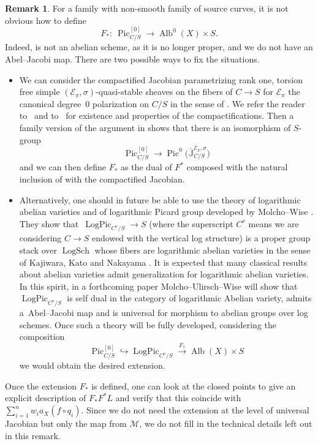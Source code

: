 \documentclass[pdftex]{sigma}
\newcommand{\Pic}{\operatorname{Pic}}
\newcommand{\Alb}{\operatorname{Alb}}
\newcommand{\M}{\mathcal{M}}
\numberwithin{equation}{section}
\theoremstyle{definition}
\newtheorem{remarkk}[theo]{Remark}
\begin{document}
\begin{remarkk}
For a family  with non-smooth family of source curves, it is not obvious how to define
\[F_*\colon\ \Pic^{[0]}_{C\slash S}\to\operatorname{Alb}^0(X)\times S.\]
Indeed, \smash{$\Pic^{[0]}_{C\slash S}\to S$} is not an abelian scheme, as it is no longer proper, and we do not have an Abel--Jacobi map. There are two possible ways to fix the situations.
\begin{itemize}\itemsep=0pt
\item We can consider the compactified Jacobian \smash{$\Pic^{[0]}_{C\slash S}\subseteq \overline{\mathbb J}_{C/S}^{\mathcal E_{\pi},\sigma}$} parametrizing rank one, torsion free simple $(\mathcal E_{\pi},\sigma)$-quasi-stable sheaves on the fibers of $C\to S$ for $\mathcal E_{\pi}$ the canonical degree~$0$ polarization on $C\slash S$ in the sense of \cite[Section~2.1]{melo2015compactifications}. We refer the reader to~\cite{melo2015compactifications} and to~\cite{MeloRapagnettaViviani} for existence and properties of the compactifications.
Then a family version of the argument in \cite[Section~5]{MeloRapagnettaViviani} shows that there is an isomorphism of $S$-group
\[
\Pic^{[0]}_{C\slash S}\to \Pic^0\bigl(\overline{\mathbb J}_{C/S}^{\mathcal E_{\pi},\sigma}\bigr)
\]
and we can then define $F_*$ as the dual of $F^*$ composed with the natural inclusion of \smash{$\Pic^{[0]}_{C\slash S}$} with the compactified Jacobian.

\item Alternatively, one should in future be able to use the theory of logarithmic abelian varieties and of logarithmic Picard group developed by Molcho--Wise \cite{molchowiselog}. They show that~$\operatorname{LogPic}_{C^v\slash S}\to S$ (where the superscript $C^v$ means we are considering $C\to S$ endowed with the vertical log structure)
is a proper group stack over $\operatorname{LogSch}$
whose fibers are logarithmic abelian varieties in the sense of Kajiwara, Kato and Nakayama \cite{kajiwara2008logarithmic}.
It is expected that many classical results about abelian varieties admit generalization for logarithmic abelian varieties. In this spirit, in a forthcoming paper \cite{delignepair} Molcho--Ulirsch--Wise will show that $\operatorname{LogPic}_{C^v\slash S}$ is self dual in the category of logarithmic Abelian variety, admits a~Abel--Jacobi map and is universal for morphism to abelian groups over log schemes.
Once such a theory will be fully developed, considering the composition
 \[
 \Pic^{[0]}_{C\slash S}\hookrightarrow \operatorname{LogPic}_{C^v\slash S}\xrightarrow{F_*}\Alb(X)\times S
 \]
we would obtain the desired extension.
\end{itemize}

Once the extension $F_*$ is defined, one can look at the closed points to give an explicit description of $F_*F^*L$ and verify that this coincide with $\sum_{i=1}^n w_i a_X(f\circ q_i)$.
Since we do not need the extension at the level of universal Jacobian but only the map from $\M$, we do not fill in the technical details left out in this remark.
\end{remarkk}
\end{document}
